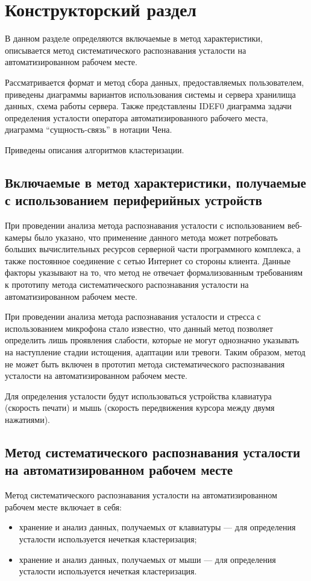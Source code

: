 \section{Конструкторский раздел}
В данном разделе определяются включаемые в метод характеристики, описывается метод систематического распознавания усталости на автоматизированном рабочем месте.

Рассматривается формат и метод сбора данных, предоставляемых пользователем, приведены диаграммы вариантов использования системы и сервера хранилища данных, схема работы сервера. Также представлены IDEF0 диаграмма задачи определения усталости оператора автоматизированного рабочего места, диаграмма ``сущность-связь'' в нотации Чена.

Приведены описания алгоритмов кластеризации.

\subsection{Включаемые в метод характеристики, получаемые с использованием периферийных устройств}

При проведении анализа метода распознавания усталости с использованием веб-камеры было указано, что применение данного метода может потребовать больших вычислительных ресурсов серверной части программного комплекса, а также постоянное соединение с сетью Интернет со стороны клиента. Данные факторы указывают на то, что метод не отвечает формализованным требованиям к прототипу метода систематического распознавания усталости на автоматизированном рабочем месте.

При проведении анализа метода распознавания усталости и стресса с использованием микрофона стало известно, что данный метод позволяет определить лишь проявления слабости, которые не могут однозначно указывать на наступление стадии истощения, адаптации или тревоги. Таким образом, метод не может быть включен в прототип метода систематического распознавания усталости на автоматизированном рабочем месте.

Для определения усталости будут использоваться устройства клавиатура (скорость печати) и мышь (скорость передвижения курсора между двумя нажатиями).

\subsection{Метод систематического распознавания усталости на автоматизированном рабочем месте}
Метод систематического распознавания усталости на автоматизированном рабочем месте включает в себя:
\begin{itemize}[leftmargin=1.6\parindent]
\item хранение и анализ данных, получаемых от клавиатуры --- для определения усталости используется нечеткая кластеризация;
\item хранение и анализ данных, получаемых от мыши --- для определения усталости используется нечеткая кластеризация.
\end{itemize}

